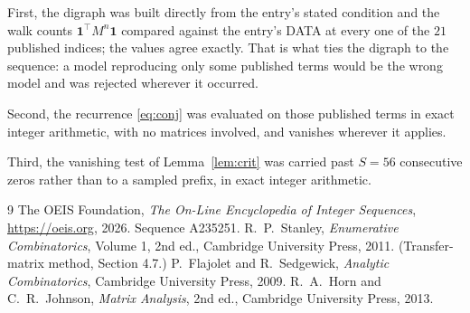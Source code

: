 \documentclass[11pt,a4paper]{article}
\theoremstyle{plain}
\theoremstyle{definition}
\begin{document}
First, the digraph was built directly from the entry's stated condition and the walk counts
$\mathbf{1}^{\!\top}M^{n}\mathbf{1}$ compared against the entry's DATA at every one of
the $21$ published indices; the values agree exactly. That is what ties the digraph to
the sequence: a model reproducing only some published terms would be the wrong model and
was rejected wherever it occurred.

Second, the recurrence \eqref{eq:conj} was evaluated on those published terms in exact
integer arithmetic, with no matrices involved, and vanishes wherever it applies.

Third, the vanishing test of Lemma~\ref{lem:crit} was carried past $S=56$ consecutive
zeros rather than to a sampled prefix, in exact integer arithmetic.

\begin{thebibliography}{9}
 The OEIS Foundation, \emph{The On-Line Encyclopedia of Integer
Sequences}, \url{https://oeis.org}, 2026. Sequence A235251.
 R.~P.~Stanley, \emph{Enumerative Combinatorics}, Volume 1, 2nd ed.,
Cambridge University Press, 2011. (Transfer-matrix method, Section 4.7.)
 P.~Flajolet and R.~Sedgewick, \emph{Analytic Combinatorics}, Cambridge
University Press, 2009.
 R.~A.~Horn and C.~R.~Johnson, \emph{Matrix Analysis}, 2nd ed., Cambridge
University Press, 2013.
\end{thebibliography}
\end{document}
